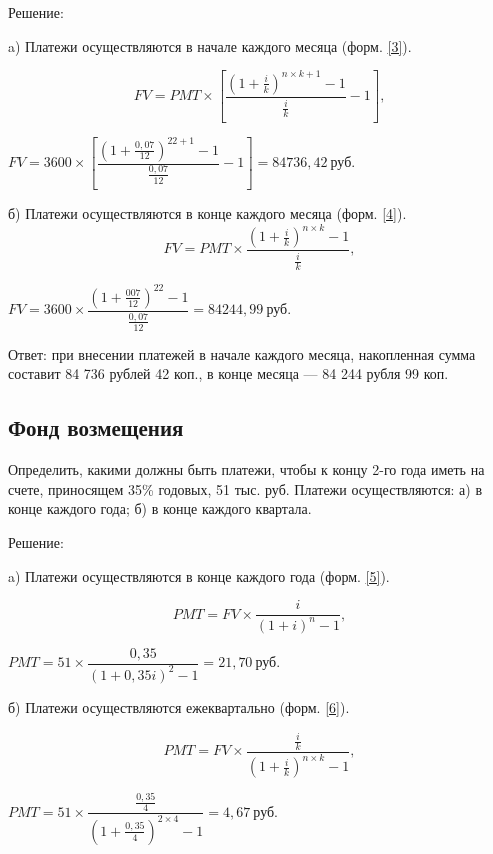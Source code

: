 Решение:

a) Платежи осуществляются в начале каждого месяца (форм. \ref{3}).

\begin{equation}\label{3}
FV = PMT \times \left[\dfrac{\left(1+\frac{i}{k}\right)^{n \times k +1}-1}{\frac{i}{k}}-1 \right],
\end{equation}

$ FV = 3600\times \left[\dfrac{\left(1+\frac{0,07}{12}\right)^{22+1}-1}{\frac{0,07}{12}}-1 \right] = 84736,42 \  \text{руб.}   $

б) Платежи осуществляются в конце каждого месяца (форм. \ref{4}).
\begin{equation}\label{4}
FV =PMT \times \dfrac{(1+\frac{i}{k})^{n \times k}-1}{\frac{i}{k}},
\end{equation}

$ FV =3600 \times \dfrac{(1+\frac{007}{12})^{22}-1}{\frac{0,07}{12}} = 84244,99 \  \text{руб.} $

Ответ: при внесении платежей в начале каждого месяца, накопленная сумма составит 84 736 рублей 42 коп., в конце месяца --- 84 244 рубля 99 коп.

\subsection{Фонд возмещения}

Определить, какими должны быть платежи, чтобы к концу 2-го года иметь на счете, приносящем 35\% годовых, 51 тыс. руб. Платежи осуществляются: а) в конце каждого года; б) в конце каждого квартала.

Решение:

a) Платежи осуществляются в конце каждого года (форм. \ref{5}).

\begin{equation}\label{5}
PMT = FV \times \dfrac{i}{(1+i)^n-1},
\end{equation}

$ PMT = 51 \times \dfrac{0,35}{(1+0,35i)^2-1} = 21,70 \  \text{руб.}$

б) Платежи осуществляются ежеквартально (форм. \ref{6}).

\begin{equation}\label{6}
PMT = FV \times \dfrac{\frac{i}{k}}{(1+\frac{i}{k})^{n \times k}-1},
\end{equation}

$ PMT = 51 \times \dfrac{\frac{0,35}{4}}{(1+\frac{0,35}{4})^{2 \times 4}-1} = 4,67\  \text{руб.} $

